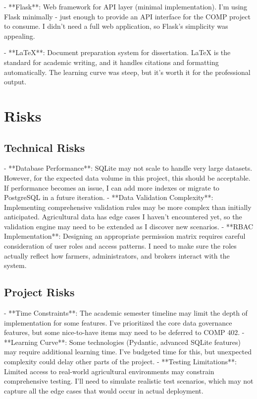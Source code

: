- **Flask**: Web framework for API layer (minimal implementation). I'm using Flask minimally - just enough to provide an API interface for the COMP project to consume. I didn't need a full web application, so Flask's simplicity was appealing.

- **LaTeX**: Document preparation system for dissertation. LaTeX is the standard for academic writing, and it handles citations and formatting automatically. The learning curve was steep, but it's worth it for the professional output.

\section{Risks}

\subsection{Technical Risks}
- **Database Performance**: SQLite may not scale to handle very large datasets. However, for the expected data volume in this project, this should be acceptable. If performance becomes an issue, I can add more indexes or migrate to PostgreSQL in a future iteration.
- **Data Validation Complexity**: Implementing comprehensive validation rules may be more complex than initially anticipated. Agricultural data has edge cases I haven't encountered yet, so the validation engine may need to be extended as I discover new scenarios.
- **RBAC Implementation**: Designing an appropriate permission matrix requires careful consideration of user roles and access patterns. I need to make sure the roles actually reflect how farmers, administrators, and brokers interact with the system.

\subsection{Project Risks}
- **Time Constraints**: The academic semester timeline may limit the depth of implementation for some features. I've prioritized the core data governance features, but some nice-to-have items may need to be deferred to COMP 402.
- **Learning Curve**: Some technologies (Pydantic, advanced SQLite features) may require additional learning time. I've budgeted time for this, but unexpected complexity could delay other parts of the project.
- **Testing Limitations**: Limited access to real-world agricultural environments may constrain comprehensive testing. I'll need to simulate realistic test scenarios, which may not capture all the edge cases that would occur in actual deployment.

